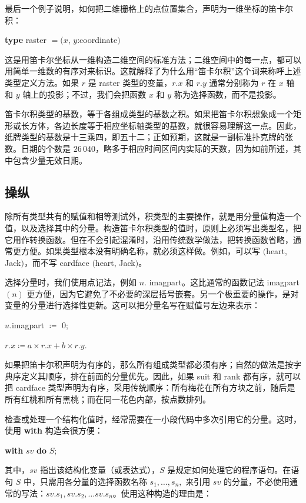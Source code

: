 最后一个例子说明，如何把二维栅格上的点位置集合，声明为一维坐标的笛卡尔积：

\quad \textbf{type} raster $= (x$, $y$:coordinate$)$

这是用笛卡尔坐标从一维构造二维空间的标准方法；二维空间中的每一点，都可以用简单一维数的有序对来标识。这就解释了为什么用“笛卡尔积”这个词来称呼上述类型定义方法。如果 $r$ 是 raster 类型的变量，$r.x$ 和 $r.y$ 通常分别称为 $r$ 在 $x$ 轴和 $y$ 轴上的投影；不过，我们会把函数 $x$ 和 $y$ 称为选择函数，而不是投影。

笛卡尔积类型的基数，等于各组成类型的基数之积。如果把笛卡尔积想象成一个矩形或长方体，各边长度等于相应坐标轴类型的基数，就很容易理解这一点。因此，纸牌类型的基数是十三乘四，即五十二；正如预期，这就是一副标准扑克牌的张数。日期的个数是 $26\,040$，略多于相应时间区间内实际的天数，因为如前所述，其中包含少量无效日期。

\subsection{操纵}

除所有类型共有的赋值和相等测试外，积类型的主要操作，就是用分量值构造一个值，以及选择其中的分量。构造笛卡尔积类型的值时，原则上必须写出类型名，把它用作转换函数。但在不会引起混淆时，沿用传统数学做法，把转换函数省略，通常更方便。如果类型根本没有明确名称，就必须这样做。例如，可以写 $($heart, Jack$)$，而不写 cardface $($heart, Jack$)$。

选择分量时，我们使用点记法，例如 $n$. imagpart。这比通常的函数记法 imagpart$(n)$ 更方便，因为它避免了不必要的深层括号嵌套。另一个极重要的操作，是对变量的分量进行选择性更新。这可以把分量名写在赋值号左边来表示：

\quad $u$.imagpart $\coloneq$ 0;

\quad $r.x \coloneq a\times r.x + b\times r.y$.

如果把笛卡尔积声明为有序的，那么所有组成类型都必须有序；自然的做法是按字典序定义其顺序，排在前面的分量优先。因此，如果 suit 和 rank 都有序，就可以把 cardface 类型声明为有序，采用传统顺序：所有梅花在所有方块之前，随后是所有红桃和所有黑桃；而在同一花色内部，按点数排列。

检查或处理一个结构化值时，经常需要在一小段代码中多次引用它的分量。这时，使用 \textbf{with} 构造会很方便：

\quad \textbf{with} $sv$ \textbf{do} $S$;

\noindent
其中，$sv$ 指出该结构化变量（或表达式），$S$ 是规定如何处理它的程序语句。在语句 $S$ 中，只需用各分量的选择函数名称 $s_1, \dots, s_n,$ 来引用 $sv$ 的分量，不必使用通常的写法：$sv.s_1, sv.s_2, \dots sv.s_n$。使用这种构造的理由是：

